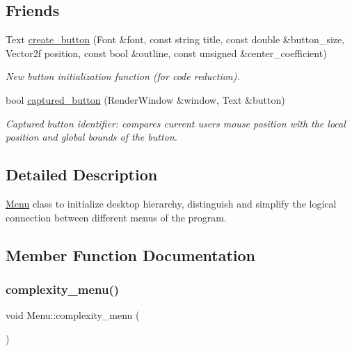\subsection*{Friends}
\begin{DoxyCompactItemize}
\item 
Text \hyperlink{classMenu_a17db731fc4056230798f5164a4e9d7da}{create\+\_\+button} (Font \&font, const string title, const double \&button\+\_\+size, Vector2f position, const bool \&outline, const unsigned \&center\+\_\+coefficient)
\begin{DoxyCompactList}\small\item\em New button initialization function (for code reduction). \end{DoxyCompactList}\item 
bool \hyperlink{classMenu_a46f7d09cf27de9dcc1580cfd6d2f05d5}{captured\+\_\+button} (Render\+Window \&window, Text \&button)
\begin{DoxyCompactList}\small\item\em Captured button identifier\+: compares current user\textquotesingle{}s mouse position with the local position and global bounds of the button. \end{DoxyCompactList}\end{DoxyCompactItemize}


\subsection{Detailed Description}
\hyperlink{classMenu}{Menu} class to initialize desktop hierarchy, distinguish and simplify the logical connection between different menus of the program. 

\subsection{Member Function Documentation}
\mbox{\label{classMenu_a960114ed888630f8228cbed065a841c6}} 
\subsubsection{\texorpdfstring{complexity\+\_\+menu()}{complexity\_menu()}}
{\footnotesize\ttfamily void Menu\+::complexity\+\_\+menu (\begin{DoxyParamCaption}{ }\end{DoxyParamCaption})}



